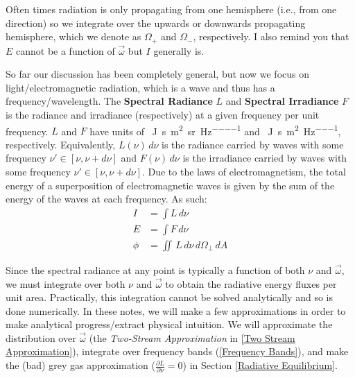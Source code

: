 Often times radiation is only propagating from one hemisphere (i.e., from one direction) so we integrate over the upwards or downwards propagating hemisphere, which we denote as $\Omega_+$ and $\Omega_-$, respectively. I also remind you that $E$ cannot be a function of $\vec{\omega}$ but $I$ generally is.

So far our discussion has been completely general, but now we focus on light/electromagnetic radiation, which is a wave and thus has a frequency/wavelength. The \textbf{Spectral Radiance} $L$ and \textbf{Spectral Irradiance} $F$ is the radiance and irradiance (respectively) at a given frequency per unit frequency. $L$ and $F$ have units of \qty{}{\joule\per\second\per\metre\squared\per\steradian\per\hertz} and \qty{}{\joule\per\second\per\metre\squared\per\hertz}, respectively. Equivalently, $L(\nu)\,d\nu$ is the radiance carried by waves with some frequency $\nu'\in[\nu,\nu+d\nu]$ and $F(\nu)\,d\nu$ is the irradiance carried by waves with some frequency $\nu'\in[\nu,\nu+d\nu]$. Due to the laws of electromagnetism, the total energy of a superposition of electromagnetic waves is given by the sum of the energy of the waves at each frequency. As such:
\begin{align}
    I&=\int L\,d\nu\\
    E&=\int F\, d\nu\\
    \phi&=\iint\,L\,d\nu\,d\Omega_\perp\,dA
\end{align}

Since the spectral radiance at any point is typically a function of both $\nu$ and $\vec{\omega}$, we must integrate over both $\nu$ and $\vec{\omega}$ to obtain the radiative energy fluxes per unit area. Practically, this integration cannot be solved analytically and so is done numerically. In these notes, we will make a few approximations in order to make analytical progress/extract physical intuition. We will approximate the distribution over $\vec{\omega}$ (the \textit{Two-Stream Approximation} in \ref{Two Stream Approximation}), integrate over frequency bands (\ref{Frequency Bands}), and make the (bad) grey gas approximation ($\frac{\partial L}{\partial \nu}=0$) in Section \ref{Radiative Equilibrium}.

